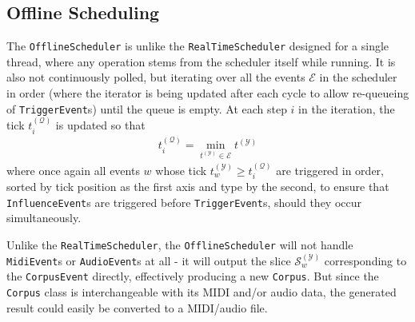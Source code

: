 \subsection{Offline Scheduling}\label{sec:4-generator-evaluator-offline}
The \texttt{OfflineScheduler} is unlike the \texttt{RealTimeScheduler} designed for a single thread, where any operation stems from the scheduler itself while running. It is also not continuously polled, but iterating over all the events $\mathcal E$ in the scheduler in order (where the iterator is being updated after each cycle to allow re-queueing of \texttt{TriggerEvent}s) until the queue is empty. At each step $i$ in the iteration, the tick $t^{(\mathcal Q)}_i$ is updated so that
\begin{align}
	t^{(\mathcal Q)}_i = \operatorname*{min}_{t^{(\mathcal Y)} \in \mathcal E} t^{(\mathcal Y)}
\end{align}
where once again all events $w$ whose tick $t^{(\mathcal Y)}_w \ge t_i^{(\mathcal Q)}$ are triggered in order, sorted by tick position as the first axis and type by the second, to ensure that \texttt{InfluenceEvent}s are triggered before \texttt{TriggerEvent}s, should they occur simultaneously.

Unlike the \texttt{RealTimeScheduler}, the \texttt{OfflineScheduler} will not handle \texttt{Midi\-Event}s or \texttt{AudioEvent}s at all - it will output the slice $\mathcal S^{(\mathcal Y)}_w$ corresponding to the \texttt{CorpusEvent} directly, effectively producing a new \texttt{Corpus}. But since the \texttt{Corpus} class is interchangeable with its MIDI and/or audio data, the generated result could easily be converted to a MIDI/audio file.


